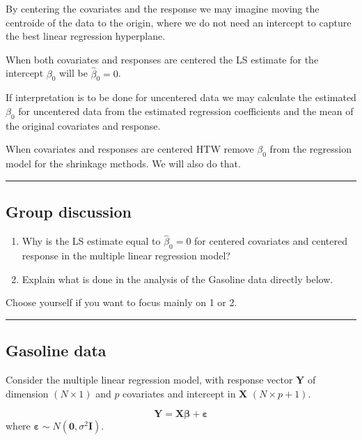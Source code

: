\documentclass[
  letterpaper,
  DIV=11,
  numbers=noendperiod]{scrartcl}
\begin{document}
By centering the covariates and the response we may imagine moving the
centroide of the data to the origin, where we do not need an intercept
to capture the best linear regression hyperplane.

When both covariates and responses are centered the LS estimate for the
intercept \(\beta_0\) will be \(\hat{\beta}_0=0\).

If interpretation is to be done for uncentered data we may calculate the
estimated \(\beta_0\) for uncentered data from the estimated regression
coefficients and the mean of the original covariates and response.

When covariates and responses are centered HTW remove \(\beta_0\) from
the regression model for the shrinkage methods. We will also do that.

\begin{center}\rule{0.5\linewidth}{0.5pt}\end{center}

\hypertarget{group-discussion}{%
\subsection{Group discussion}\label{group-discussion}}

\begin{enumerate}
\def\labelenumi{\arabic{enumi})}
\item
  Why is the LS estimate equal to \(\hat{\beta}_0=0\) for centered
  covariates and centered response in the multiple linear regression
  model?
\item
  Explain what is done in the analysis of the Gasoline data directly
  below.
\end{enumerate}

Choose yourself if you want to focus mainly on 1 or 2.

\begin{center}\rule{0.5\linewidth}{0.5pt}\end{center}

\hypertarget{gasoline-data}{%
\subsection{Gasoline data}\label{gasoline-data}}

Consider the multiple linear regression model, with response vector
\(\mathbf{Y}\) of dimension \((N \times 1)\) and \(p\) covariates and
intercept in \(\mathbf{X}\) \((N \times p+1)\).

\[\mathbf{Y} = \mathbf{X}\mathbf{\beta} + \boldsymbol{\varepsilon}\]
where \(\boldsymbol{\varepsilon}\sim N(\mathbf{0},\sigma^2\mathbf{I})\).
\end{document}
